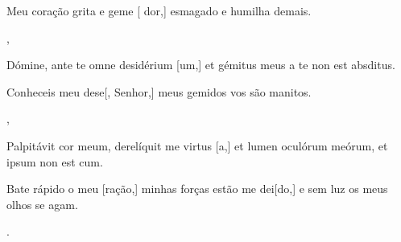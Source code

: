 {        {\item {}Meu coração grita e geme [ dor,] esmagado e humilha demais.},
    {\item {}Dómine, ante te omne desidérium [um,] et gémitus meus a te non est absditus.}%
        {\item {}Conheceis meu dese[, Senhor,] meus gemidos vos são manitos.},
    {\item {}Palpitávit cor meum, derelíquit me virtus [a,] et lumen oculórum meórum, et ipsum non est \-cum.}%
        {\item {}Bate rápido o meu [ração,] minhas forças estão me dei[do,] e sem luz os meus olhos se agam.}.
}